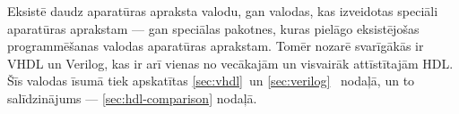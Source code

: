 Eksistē daudz aparatūras apraksta valodu, gan valodas, kas izveidotas
speciāli aparatūras aprakstam --- gan speciālas pakotnes, kuras pielāgo
eksistējošas programmēšanas valodas aparatūras aprakstam.
Tomēr nozarē svarīgākās ir VHDL un Verilog, kas ir arī
vienas no vecākajām un visvairāk attīstītajām HDL.
Šīs valodas īsumā tiek apskatītas \ref{sec:vhdl}~un \ref{sec:verilog}~%
nodaļā, un to salīdzinājums --- \ref{sec:hdl-comparison} nodaļā.

 \clearpage %

